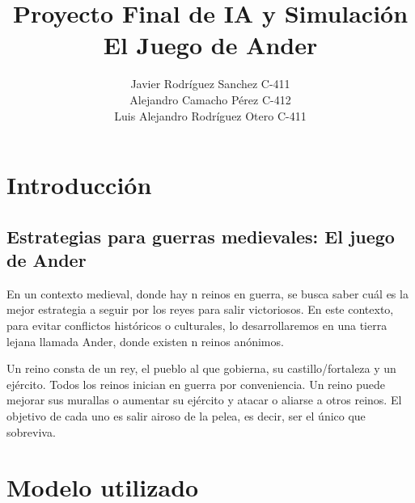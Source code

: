 \documentclass[11pt]{article}
\author{
    Javier Rodríguez Sanchez C-411 \\ 
    Alejandro Camacho Pérez C-412 \\ 
    Luis Alejandro Rodríguez Otero C-411
    }
\title{Proyecto Final de IA y Simulación \\ El Juego de Ander}
\begin{document}
    \maketitle
    \newpage

    \tableofcontents
    \newpage

    \section{Introducción}
        \subsection{Estrategias para guerras medievales: El juego de Ander}
        En un contexto medieval, donde hay n reinos en guerra, se busca saber 
        cuál es la mejor estrategia a seguir por los reyes para salir victoriosos. 
        En este contexto, para evitar conflictos históricos o culturales, lo 
        desarrollaremos en una tierra lejana llamada Ander, donde existen n reinos 
        anónimos. \vspace{5mm}

        \noindent Un reino consta de un rey, el pueblo al que gobierna, su castillo/fortaleza 
        y un ejército. Todos los reinos inician en guerra por conveniencia. Un reino 
        puede mejorar sus murallas o aumentar su ejército y atacar o aliarse a otros reinos. 
        El objetivo de cada uno es salir airoso de la pelea, es decir, ser el único que sobreviva.

    \newpage

    \section{Modelo utilizado}
\end{document}

